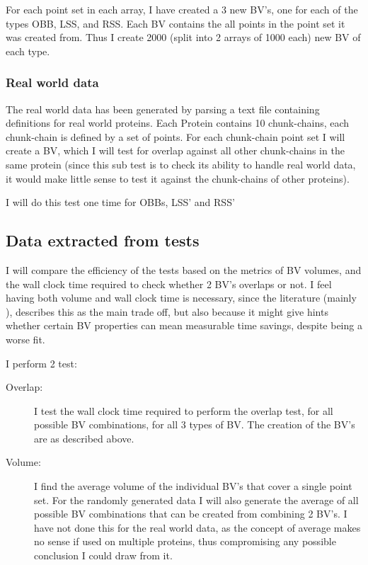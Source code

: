 For each point set in each array, I have created a 3 new BV's, one for
each of the types OBB, LSS, and RSS. Each BV contains the all points
in the point set it was created from. Thus I create 2000 (split into 2 arrays of 1000 each)
new BV of each type. \\ 

\subsubsection{Real world data}
The real world data has been generated by parsing a text file containing definitions for real world proteins. Each Protein contains 10 chunk-chains, each chunk-chain is defined by a set of points. For each chunk-chain point set I will create a BV, which I will test for overlap against all other chunk-chains in the same protein (since this sub test is to check its ability to handle real world data, it would make little sense to test it against the chunk-chains of other proteins). 

I will do this test one time for OBBs, LSS' and RSS'

\subsection{Data extracted from tests}

I will compare the efficiency of the tests based on the metrics of BV volumes, and the wall clock time required to check whether 2 BV's overlaps or not. I feel having both volume and wall clock time is necessary, since the literature (mainly \cite{Lotan03algorithmand}), describes this as the main trade off, but also because it might give hints whether certain BV properties can mean measurable time savings, despite being a worse fit. 

I perform 2 test: 
\begin{description}
\item[Overlap:] I test the wall clock time required to perform the overlap test,
  for all possible BV combinations, for all 3 types of BV. The creation of the BV's are as described above.
 
\item[Volume:] I find the average volume of the individual BV's that cover a single point set. For the randomly generated data I will also generate the average of all possible BV combinations that can be created from combining 2 BV's. I have not done this for the real world data, as the concept of average makes no sense if used on multiple proteins, thus compromising any possible conclusion I could draw from it.
\end{description}

